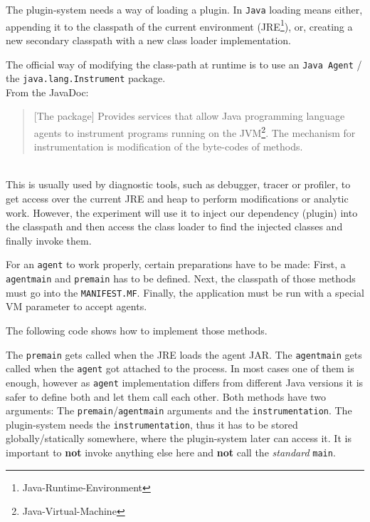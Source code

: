 The plugin-system needs a way of loading a plugin.
In \texttt{Java} loading means either, appending it to the classpath of the current environment (JRE\footnote{Java-Runtime-Environment}), or, creating a new secondary classpath with a new class loader implementation.

The official way of modifying the class-path at runtime is to use an \texttt{Java Agent} / the \texttt{java.lang.Instrument} package. \\
From the JavaDoc:
\begin{quote}
    [The package] Provides services that allow Java programming language agents to instrument programs running on the JVM\footnote{Java-Virtual-Machine}.\newline
    The mechanism for instrumentation is modification of the byte-codes of methods.
\end{quote}~\parencite{javadoc:instrument}\\\clearpage
This is usually used by diagnostic tools, such as debugger, tracer or profiler, to get access over the current JRE and heap to perform modifications or analytic work.
However, the experiment will use it to inject our dependency (plugin) into the classpath and then access the class loader to find the injected classes and finally invoke them.

For an \texttt{agent} to work properly, certain preparations have to be made:
First, a \lstinline{agentmain} and \lstinline{premain} has to be defined.
Next, the classpath of those methods must go into the \texttt{MANIFEST.MF}.
Finally, the application must be run with a special VM parameter to accept agents.

The following code shows how to implement those methods.

The \lstinline{premain} gets called when the JRE loads the agent JAR.
The \lstinline{agentmain} gets called when the \texttt{agent} got attached to the process.
In most cases one of them is enough, however as \texttt{agent} implementation differs from different Java versions it is safer to define both and let them call each other.
Both methods have two arguments: 
The \lstinline{premain}/\lstinline{agentmain} arguments and the \lstinline{instrumentation}.
The plugin-system needs the \lstinline{instrumentation}, thus it has to be stored globally/statically somewhere, where the plugin-system later can access it.
It is important to \textbf{not} invoke anything else here and \textbf{not} call the \textit{standard} \lstinline{main}.

